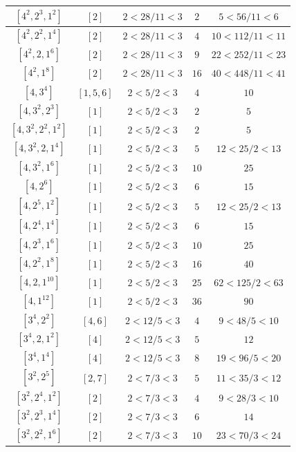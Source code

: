 \documentclass{article}%
\begin{document}
\begin{center}
\begin{longtable}{||c|c|c|c|c||}
$[4^{2}, 2^{3}, 1^{2}]$ & $[2]$ & $2 < 28/11 < 3$ & $2$ & $5 < 56/11 < 6$ \\ \hline 
$[4^{2}, 2^{2}, 1^{4}]$ & $[2]$ & $2 < 28/11 < 3$ & $4$ & $10 < 112/11 < 11$ \\ \hline 
$[4^{2}, 2, 1^{6}]$ & $[2]$ & $2 < 28/11 < 3$ & $9$ & $22 < 252/11 < 23$ \\ \hline 
$[4^{2}, 1^{8}]$ & $[2]$ & $2 < 28/11 < 3$ & $16$ & $40 < 448/11 < 41$ \\ \hline 
$[4, 3^{4}]$ & $[1, 5, 6]$ & $2 < 5/2 < 3$ & $4$ & $10$ \\ \hline 
$[4, 3^{2}, 2^{3}]$ & $[1]$ & $2 < 5/2 < 3$ & $2$ & $5$ \\ \hline 
$[4, 3^{2}, 2^{2}, 1^{2}]$ & $[1]$ & $2 < 5/2 < 3$ & $2$ & $5$ \\ \hline 
$[4, 3^{2}, 2, 1^{4}]$ & $[1]$ & $2 < 5/2 < 3$ & $5$ & $12 < 25/2 < 13$ \\ \hline 
$[4, 3^{2}, 1^{6}]$ & $[1]$ & $2 < 5/2 < 3$ & $10$ & $25$ \\ \hline 
$[4, 2^{6}]$ & $[1]$ & $2 < 5/2 < 3$ & $6$ & $15$ \\ \hline 
$[4, 2^{5}, 1^{2}]$ & $[1]$ & $2 < 5/2 < 3$ & $5$ & $12 < 25/2 < 13$ \\ \hline 
$[4, 2^{4}, 1^{4}]$ & $[1]$ & $2 < 5/2 < 3$ & $6$ & $15$ \\ \hline 
$[4, 2^{3}, 1^{6}]$ & $[1]$ & $2 < 5/2 < 3$ & $10$ & $25$ \\ \hline 
$[4, 2^{2}, 1^{8}]$ & $[1]$ & $2 < 5/2 < 3$ & $16$ & $40$ \\ \hline 
$[4, 2, 1^{10}]$ & $[1]$ & $2 < 5/2 < 3$ & $25$ & $62 < 125/2 < 63$ \\ \hline 
$[4, 1^{12}]$ & $[1]$ & $2 < 5/2 < 3$ & $36$ & $90$ \\ \hline 
$[3^{4}, 2^{2}]$ & $[4, 6]$ & $2 < 12/5 < 3$ & $4$ & $9 < 48/5 < 10$ \\ \hline 
$[3^{4}, 2, 1^{2}]$ & $[4]$ & $2 < 12/5 < 3$ & $5$ & $12$ \\ \hline 
$[3^{4}, 1^{4}]$ & $[4]$ & $2 < 12/5 < 3$ & $8$ & $19 < 96/5 < 20$ \\ \hline 
$[3^{2}, 2^{5}]$ & $[2, 7]$ & $2 < 7/3 < 3$ & $5$ & $11 < 35/3 < 12$ \\ \hline 
$[3^{2}, 2^{4}, 1^{2}]$ & $[2]$ & $2 < 7/3 < 3$ & $4$ & $9 < 28/3 < 10$ \\ \hline 
$[3^{2}, 2^{3}, 1^{4}]$ & $[2]$ & $2 < 7/3 < 3$ & $6$ & $14$ \\ \hline 
$[3^{2}, 2^{2}, 1^{6}]$ & $[2]$ & $2 < 7/3 < 3$ & $10$ & $23 < 70/3 < 24$ \\ \hline 

\end{longtable}
\end{center}
\end{document}
